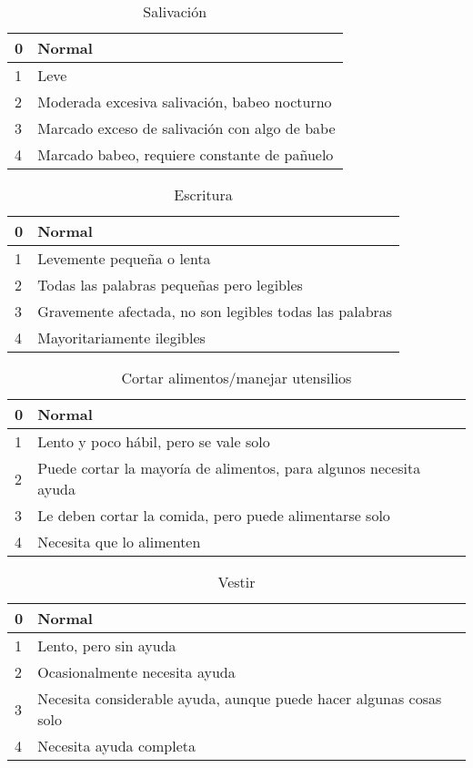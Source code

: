 \begin{table}[H]
\begin{center}
\begin{tabular}{|p{1cm}|p{11cm}|}
\hline
0 & Normal \\\hline
1 & Leve \\\hline
2 & Moderada excesiva salivación, babeo nocturno \\\hline
3 & Marcado exceso de salivación con algo de babe \\\hline
4 & Marcado babeo, requiere constante de pañuelo \\\hline
\end{tabular}
\caption{Salivación}
\end{center}
\end{table}

\begin{table}[H]
\begin{center}
\begin{tabular}{|p{1cm}|p{11cm}|}
\hline
0 & Normal \\\hline
1 & Levemente pequeña o lenta \\\hline
2 & Todas las palabras pequeñas pero legibles \\\hline
3 & Gravemente afectada, no son legibles todas las palabras \\\hline
4 & Mayoritariamente ilegibles\\\hline
\end{tabular}
\caption{Escritura}
\end{center}
\end{table}

\begin{table}[H]
\begin{center}
\begin{tabular}{|p{1cm}|p{11cm}|}
\hline
0 & Normal \\\hline
1 & Lento y poco hábil, pero se vale solo \\\hline
2 & Puede cortar la mayoría de alimentos, para algunos necesita ayuda\\\hline
3 & Le deben cortar la comida, pero puede alimentarse solo \\\hline
4 & Necesita que lo alimenten\\\hline
\end{tabular}
\caption{Cortar alimentos/manejar utensilios}
\end{center}
\end{table}

\begin{table}[H]
\begin{center}
\begin{tabular}{|p{1cm}|p{11cm}|}
\hline
0 & Normal \\\hline
1 & Lento, pero sin ayuda \\\hline
2 & Ocasionalmente necesita ayuda\\\hline
3 & Necesita considerable ayuda, aunque puede hacer algunas cosas solo \\\hline
4 & Necesita ayuda completa\\\hline
\end{tabular}
\caption{Vestir}
\end{center}
\end{table}


